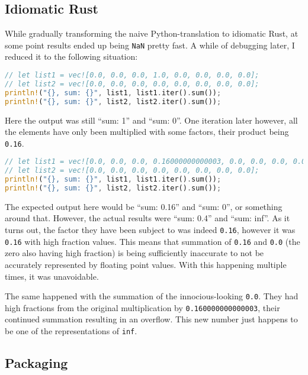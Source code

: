 \subsection{Idiomatic Rust}

While gradually transforming the naive Python-translation to idiomatic Rust, at
some point results ended up being \verb|NaN| pretty fast. A while of
debugging later, I reduced it to the following situation:

\vline
\begin{lstlisting}[language=Rust]
// let list1 = vec![0.0, 0.0, 0.0, 1.0, 0.0, 0.0, 0.0, 0.0];
// let list2 = vec![0.0, 0.0, 0.0, 0.0, 0.0, 0.0, 0.0, 0.0];
println!("{}, sum: {}", list1, list1.iter().sum());
println!("{}, sum: {}", list2, list2.iter().sum());
\end{lstlisting}
\vline

Here the output was still ``sum: 1'' and ``sum: 0''. One iteration later however, all the elements have only been multiplied with some factors, their product being \verb|0.16|.

\vline
\begin{lstlisting}[language=Rust]
// let list1 = vec![0.0, 0.0, 0.0, 0.16000000000003, 0.0, 0.0, 0.0, 0.0];
// let list2 = vec![0.0, 0.0, 0.0, 0.0, 0.0, 0.0, 0.0, 0.0];
println!("{}, sum: {}", list1, list1.iter().sum());
println!("{}, sum: {}", list2, list2.iter().sum());
\end{lstlisting}
\vline

The expected output here would be ``sum: 0.16'' and ``sum: 0'', or something
around that. However, the actual results were ``sum: 0.4'' and ``sum: inf''. As
it turns out, the factor they have been subject to was indeed \verb|0.16|,
however it was \verb|0.16| with high fraction values. This means that summation
of \verb|0.16| and \verb|0.0| (the zero also having high fraction) is being
sufficiently inaccurate to not be accurately represented by floating point
values. With this happening multiple times, it was unavoidable.

The same happened with the summation of the innocious-looking \verb|0.0|. They
had high fractions from the original multiplication by
\verb|0.160000000000003|, their continued summation resulting in an overflow.
This new number just happens to be one of the representations of \verb|inf|.


\subsection{Packaging}

